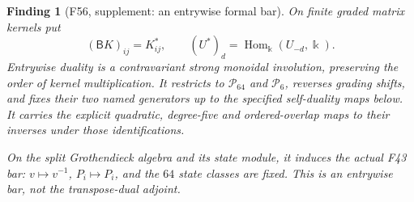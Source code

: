 \documentclass[11pt,a4paper]{article}
\newcommand{\fid}[1]{\textsf{#1}}\newcommand{\gate}[1]{\textsf{#1}}
\theoremstyle{named}\newtheorem{finding}{Finding}[section]
\theoremstyle{definition}\newtheorem{definition}[finding]{Definition}
\theoremstyle{remark}\newtheorem{remark}[finding]{Remark}
\begin{document}
\begin{finding}[\fid{F56}, supplement: an entrywise formal bar]
\label{f:formalkernelbar}
On finite graded matrix kernels put
\[
 (\mathsf B K)_{ij}=K_{ij}^*,\qquad
 (U^*)_d=\operatorname{Hom}_{\Bbbk}(U_{-d},\Bbbk).
\]
Entrywise duality is a contravariant strong monoidal involution,
preserving the order of kernel multiplication. It restricts to
$\mathcal P_{64}$ and $\mathcal P_6$, reverses grading shifts,
and fixes their two named generators up to the specified
self-duality maps below. It carries the explicit quadratic,
degree-five and ordered-overlap maps to their inverses under
those identifications.

On the split Grothendieck algebra and its state module, it
induces the actual \fid{F43} bar: $v\mapsto v^{-1}$,
$P_i\mapsto P_i$, and the $64$ state classes are fixed.
This is an entrywise bar, not the transpose-dual adjoint.
\end{finding}
\end{document}

